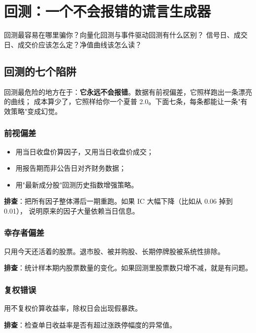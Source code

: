 \chapter{回测：一个不会报错的谎言生成器}\label{ch:backtest}

\begin{keybox}[本章要回答的问题]
回测最容易在哪里骗你？向量化回测与事件驱动回测有什么区别？
信号日、成交日、成交价应该怎么定？净值曲线该怎么读？
\end{keybox}

\section{回测的七个陷阱}

回测最危险的地方在于：\textbf{它永远不会报错}。数据有前视偏差，它照样跑出一条漂亮的曲线；
成本算少了，它照样给你一个夏普 2.0。下面七条，每条都能让一条"有效策略"变成幻觉。

\subsection{前视偏差}

\begin{itemize}
  \item 用当日收盘价算因子，又用当日收盘价成交；
  \item 用报告期而非公告日对齐财务数据；
  \item 用"最新成分股"回测历史指数增强策略。
\end{itemize}

\textbf{排查}：把所有因子整体滞后一期重跑。如果 IC 大幅下降（比如从 0.06 掉到 0.01），
说明原来的因子大量依赖当日信息。

\subsection{幸存者偏差}

只用今天还活着的股票。退市股、被并购股、长期停牌股被系统性排除。

\textbf{排查}：统计样本期内股票数量的变化。如果回测里股票数只增不减，就是有问题。

\subsection{复权错误}

用不复权价算收益率，除权日会出现假暴跌。

\textbf{排查}：检查单日收益率是否有超过涨跌停幅度的异常值。

